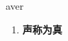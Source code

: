 
\begin{frame}
{\huge aver}
\begin{center}
\begin{enumerate}\Large
  \item \textbf{声称为真}
\end{enumerate}
\end{center}
\end{frame}
